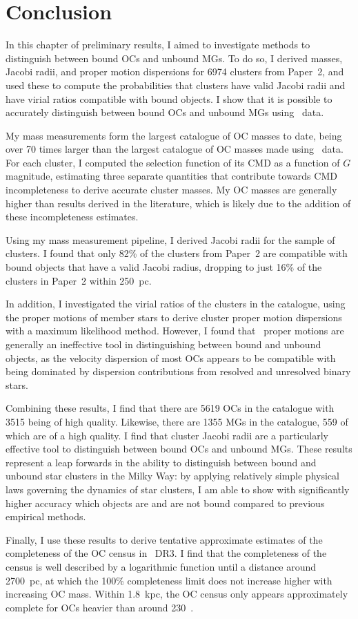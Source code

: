 \section{Conclusion}
\label{sec:dynamics:conclusion}

In this chapter of preliminary results, I aimed to investigate methods to distinguish between bound OCs and unbound MGs. To do so, I derived masses, Jacobi radii, and proper motion dispersions for 6974 clusters from Paper~2, and used these to compute the probabilities that clusters have valid Jacobi radii and have virial ratios compatible with bound objects. I show that it is possible to accurately distinguish between bound OCs and unbound MGs using \gaia\ data.

My mass measurements form the largest catalogue of OC masses to date, being over 70 times larger than the largest catalogue of OC masses made using \gaia\ data. For each cluster, I computed the selection function of its CMD as a function of $G$ magnitude, estimating three separate quantities that contribute towards CMD incompleteness to derive accurate cluster masses. My OC masses are generally higher than results derived in the literature, which is likely due to the addition of these incompleteness estimates.

Using my mass measurement pipeline, I derived Jacobi radii for the sample of clusters. I found that only 82\% of the clusters from Paper~2 are compatible with bound objects that have a valid Jacobi radius, dropping to just 16\% of the clusters in Paper~2 within 250~pc.

In addition, I investigated the virial ratios of the clusters in the catalogue, using the proper motions of member stars to derive cluster proper motion dispersions with a maximum likelihood method. However, I found that \gaia\ proper motions are generally an ineffective tool in distinguishing between bound and unbound objects, as the velocity dispersion of most OCs appears to be compatible with being dominated by dispersion contributions from resolved and unresolved binary stars.

Combining these results, I find that there are 5619 OCs in the catalogue with 3515 being of high quality. Likewise, there are 1355 MGs in the catalogue, 559 of which are of a high quality. I find that cluster Jacobi radii are a particularly effective tool to distinguish between bound OCs and unbound MGs. These results represent a leap forwards in the ability to distinguish between bound and unbound star clusters in the Milky Way: by applying relatively simple physical laws governing the dynamics of star clusters, I am able to show with significantly higher accuracy which objects are and are not bound compared to previous empirical methods.

Finally, I use these results to derive tentative approximate estimates of the completeness of the OC census in \gaia\ DR3. I find that the completeness of the census is well described by a logarithmic function until a distance around 2700~pc, at which the 100\% completeness limit does not increase higher with increasing OC mass. Within 1.8~kpc, the OC census only appears approximately complete for OCs heavier than around 230~\MSun.
